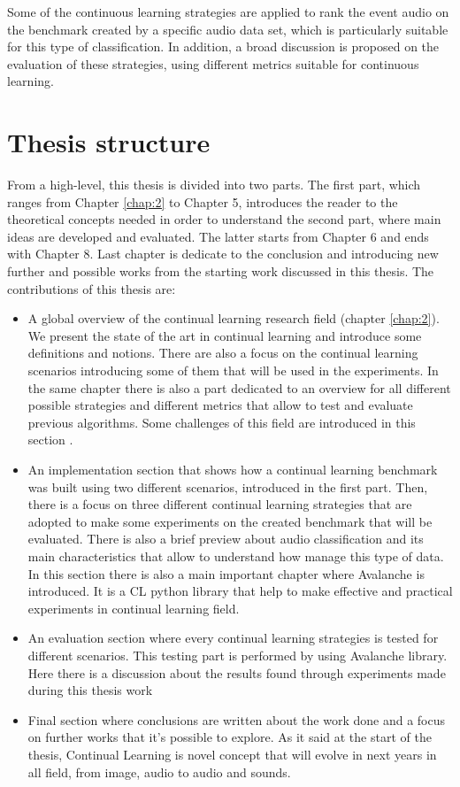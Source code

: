 \documentclass[english, LaM, oneside]{sapthesis}%
\begin{document}
Some of the continuous learning strategies are applied to rank the event audio on the benchmark created by a specific audio data set, which is particularly suitable for this type of classification. In addition, a broad discussion is proposed on the evaluation of these strategies, using different metrics suitable for continuous learning. 

\section{Thesis structure}
From a high-level, this thesis is divided into two parts. The first part, which ranges from Chapter \ref{chap:2} to Chapter 5, introduces the reader to the theoretical concepts needed in order to understand the second part, where main ideas are developed and evaluated. The latter starts from Chapter 6 and ends with Chapter 8. Last chapter is dedicate to the conclusion and introducing new further and possible works from the starting work discussed in this thesis.
The contributions of this thesis are:
\begin{itemize}
\item A global overview of the continual learning research field (chapter \ref{chap:2}). We present the state of the art in continual learning and introduce some definitions and notions. There are also a focus on the continual learning scenarios introducing some of them that will be used in the experiments. In the same chapter there is also a part dedicated to an overview for all different possible strategies and different metrics that allow to test and evaluate previous algorithms. Some challenges of this field are introduced in this section .
\item An implementation section that shows how a continual learning benchmark was built using two different scenarios, introduced in the first part. Then, there is a focus on three different continual learning strategies that are adopted to make some experiments on the created benchmark that will be evaluated. There is also a brief preview about audio classification and its main characteristics that allow to understand how manage this type of data. In this section there is also a main important chapter where Avalanche is introduced. It is a CL python library that help to make effective and practical experiments in continual learning field.
\item An evaluation section where every continual learning strategies is tested for different scenarios. This testing part is performed by using Avalanche library. Here there is a discussion about the results found through experiments made during this thesis work
\item Final section where conclusions are written about the work done and a focus on further works that it's possible to explore. As it said at the start of the thesis, Continual Learning is novel concept that will evolve in next years in all field, from image, audio to audio and sounds.
\end{itemize}
\end{document}
